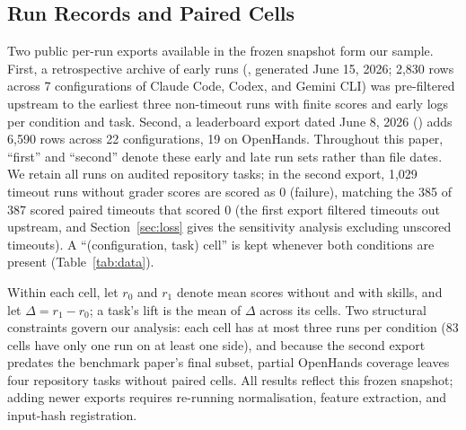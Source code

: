 \documentclass[10pt,conference]{IEEEtran}
\newif\ifkeepcuts \keepcutstrue
\newcommand{\cut}[1]{\ifkeepcuts #1\fi}
\begin{document}
\subsection{Run Records and Paired Cells}
Two public per-run exports available in the frozen snapshot form our sample. First, a retrospective archive of early runs (, generated June 15, 2026; 2,830 rows across 7 configurations of Claude Code, Codex, and Gemini CLI) was pre-filtered upstream to the earliest three non-timeout runs with finite scores and early logs per condition and task. Second, a leaderboard export dated June 8, 2026 () adds 6,590 rows across 22 configurations, 19 on OpenHands. Throughout this paper, ``first'' and ``second'' denote these early and late run sets rather than file dates. We retain all runs on audited repository tasks; in the second export, 1,029 timeout runs without grader scores are scored as 0 (failure), matching the 385 of 387 scored paired timeouts that scored 0 (the first export filtered timeouts out upstream, and Section~\ref{sec:loss} gives the sensitivity analysis excluding unscored timeouts). A ``(configuration, task) cell'' is kept whenever both conditions are present (Table~\ref{tab:data}).

Within each cell, let $r_{0}$ and $r_{1}$ denote mean scores without and with skills, and let $\Delta=r_{1}-r_{0}$; a task's lift is the mean of $\Delta$ across its cells. Two structural constraints govern our analysis: each cell has at most three runs per condition (83 cells have only one run on at least one side), and because the second export predates the benchmark paper's final subset, partial OpenHands coverage leaves four repository tasks without paired cells. All results reflect this frozen snapshot\cut{; adding newer exports requires re-running normalisation, feature extraction, and input-hash registration}.
\end{document}
